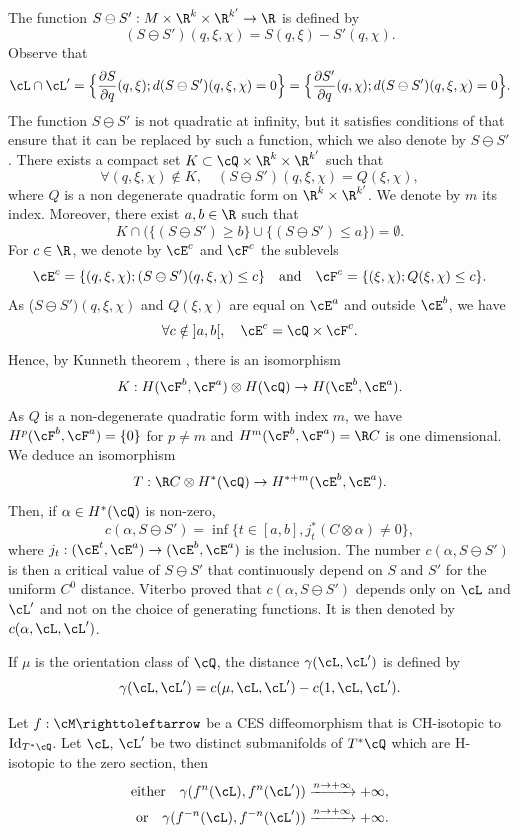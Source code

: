 The function $S\ominus S':M\times \R^k\times \R^{k'}\to \R$ is defined by
\[
(S\ominus S')(q, \xi, \chi)=S(q, \xi)-S'(q, \chi).
\]
Observe that
\[
\cL\cap\cL'=\Bigl\{\frac{\partial S}{\partial q}(q,\xi); d(S\ominus S')(q, \xi, \chi)=0\Bigr\}=\Bigl\{\frac{\partial S'}{\partial q}(q, \chi); d(S\ominus S')(q, \xi, \chi)=0\Bigr\}.
\]
The function $S\ominus S'$ is not quadratic at infinity, but it satisfies conditions of \cite[Prop.\,1.6.]{Vit2004} that ensure that it can be replaced by such a function, which we also denote by $S\ominus S'$.
There exists a compact set $K\subset \cQ\times \R^k\times \R^{k'}$ such that
\[
\forall (q, \xi, \chi)\notin K,\quad (S\ominus S')(q, \xi, \chi)=Q(\xi, \chi),
\]
where $Q$ is a non degenerate quadratic form on $\R^k\times \R^{k'}$. We denote by $m$ its index. Moreover, there exist $a, b\in\R$ such that
\[
K\cap \Big(\{ (S\ominus S')\geq b\}\cup \{ (S\ominus S')\leq a\}\Big)=\emptyset.
\]
For $c\in\R$, we denote by $\cE^c$ and $\cF^c$ the sublevels
\[
\cE^c=\{ (q, \xi, \chi); (S\ominus S')(q, \xi, \chi)\leq c\}\quad\text{and}\quad \cF^c=\{ (\xi, \chi); Q(\xi, \chi)\leq c\}.
\]
As ($S\ominus S')(q, \xi, \chi)$ and $Q(\xi, \chi)$ are equal on $\cE^a$ and outside $\cE^b$, we have
\[
\forall c\notin{}]a, b[,\quad \cE^c=\cQ\times \cF^c.
\]
Hence, by Kunneth theorem \cite{God1971},
there is an isomorphism
\[
K:H(\cF^b, \cF^a)\otimes H(\cQ)\to H(\cE^b, \cE^a).
\]
As $Q$ is a non-degenerate quadratic form with index $m$, we have $H^p(\cF^b, \cF^a)=\{ 0\}$ for $p\not=m$ and $H^m(\cF^b, \cF^a)=\R C$ is one dimensional. We deduce an isomorphism
\[
T:\R C\otimes H^*(\cQ)\to H^{*+m}(\cE^b, \cE^a).
\]
Then, if $\alpha\in H^*(\cQ)$ is non-zero,
\[
c(\alpha, S\ominus S')=\inf\{ t\in [a, b], j_t^*(C\otimes\alpha)\not=0\},
\]
where $j_t:(\cE^t, \cE^a)\to (\cE^b, \cE^a)$ is the inclusion. The number $c(\alpha, S\ominus S')$ is then a critical value of $S\ominus S'$ that continuously depend on $S$ and $S'$ for the uniform $C^0$ distance.
Viterbo proved that $c(\alpha, S\ominus S')$ depends only on $\cL$ and $\cL'$ and not on the choice of generating functions. It is then denoted by $c(\alpha, \cL, \cL')$.

If $\mu$ is the orientation class of $\cQ$, the distance $\gamma(\cL,\cL')$ is defined by
\[
\gamma(\cL, \cL')=c(\mu, \cL, \cL')-c(1, \cL, \cL').
\]

\begin{theorem}\label{Tconformgamma}
Let $f: \cM \righttoleftarrow$ be a CES diffeomorphism that is CH-isotopic to ${\rm Id}_{T^*\cQ}$. Let $\cL$, $\cL'$ be two distinct submanifolds of $T^*\cQ$ which are H-isotopic to the zero section, then
\begin{align*}
\text{either}\quad\gamma (f^n(\cL), f^n(\cL'))&\xrightarrow[]{n\to +\infty}+\infty,\\
\text{or}\quad\gamma (f^{-n}(\cL), f^{-n}(\cL'))&\xrightarrow[]{n\to +\infty}+\infty.
\end{align*}
\end{theorem}

